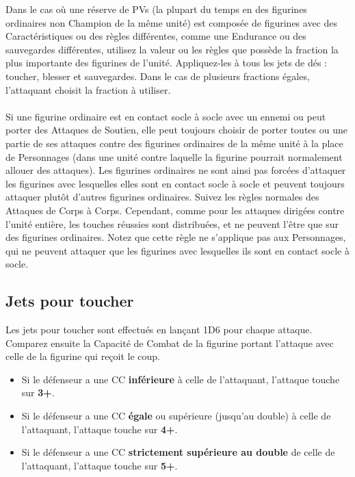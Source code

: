 Dans le cas où une réserve de PVs (la plupart du temps en des figurines ordinaires non Champion de la même unité) est composée de figurines avec des Caractéristiques ou des règles différentes, comme une Endurance ou des sauvegardes différentes, utilisez la valeur ou les règles que possède la fraction la plus importante des figurines de l'unité. Appliquez-les à tous les jets de dés : toucher, blesser et sauvegardes. Dans le cas de plusieurs fractions égales, l'attaquant choisit la fraction à utiliser.

\paragraph{\swirlingmelee}

Si une figurine ordinaire est en contact socle à socle avec un ennemi ou peut porter des Attaques de Soutien, elle peut toujours choisir de porter toutes ou une partie de ses attaques contre des figurines ordinaires de la même unité à la place de Personnages (dans une unité contre laquelle la figurine pourrait normalement allouer des attaques). Les figurines ordinaires ne sont ainsi pas forcées d'attaquer les figurines avec lesquelles elles sont en contact socle à socle et peuvent toujours attaquer plutôt d'autres figurines ordinaires. Suivez les règles normales des Attaques de Corps à Corps. Cependant, comme pour les attaques dirigées contre l'unité entière, les touches réussies sont distribuées, et ne peuvent l'être que sur des figurines ordinaires. Notez que cette règle ne s'applique pas aux Personnages, qui ne peuvent attaquer que les figurines avec lesquelles ils sont en contact socle à socle.

\newpage
\subsection{Jets pour toucher}

Les jets pour toucher sont effectués en lançant 1D6 pour chaque attaque. Comparez ensuite la Capacité de Combat de la figurine portant l'attaque avec celle de la figurine qui reçoit le coup.
\begin{itemize}[label={-}]
\item Si le défenseur a une CC \textbf{inférieure} à celle de l'attaquant, l'attaque touche sur \textbf{3+}.
\item Si le défenseur a une CC \textbf{égale} ou supérieure (jusqu'au double) à celle de l'attaquant, l'attaque touche sur \textbf{4+}.
\item Si le défenseur a une CC \textbf{strictement supérieure au double} de celle de l'attaquant, l'attaque touche sur \textbf{5+}.
\end{itemize}

